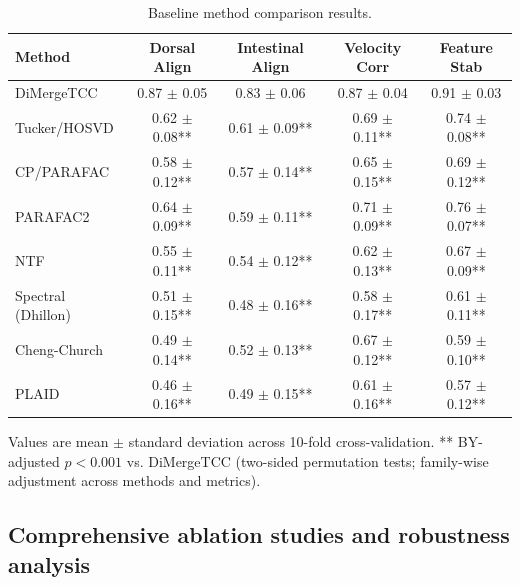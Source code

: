 \documentclass[unnumsec,webpdf,modern,large,namedate]{oup-authoring-template}%
\theoremstyle{thmstyleone}\newtheorem{theorem}{Theorem}
\theoremstyle{thmstyletwo}\newtheorem{example}{Example}
\theoremstyle{thmstylethree}\newtheorem{definition}{Definition}
\begin{document}
\begin{table}[t]
\centering
\caption{Baseline method comparison results.}
\label{tab:baseline_comparison}
\begin{tabular}{lcccc}
\toprule
\textbf{Method} & \textbf{Dorsal Align} & \textbf{Intestinal Align} & \textbf{Velocity Corr} & \textbf{Feature Stab} \\
\midrule
DiMergeTCC & 0.87 $\pm$ 0.05 & 0.83 $\pm$ 0.06 & 0.87 $\pm$ 0.04 & 0.91 $\pm$ 0.03 \\
Tucker/HOSVD & 0.62 $\pm$ 0.08** & 0.61 $\pm$ 0.09** & 0.69 $\pm$ 0.11** & 0.74 $\pm$ 0.08** \\
CP/PARAFAC & 0.58 $\pm$ 0.12** & 0.57 $\pm$ 0.14** & 0.65 $\pm$ 0.15** & 0.69 $\pm$ 0.12** \\
PARAFAC2 & 0.64 $\pm$ 0.09** & 0.59 $\pm$ 0.11** & 0.71 $\pm$ 0.09** & 0.76 $\pm$ 0.07** \\
NTF & 0.55 $\pm$ 0.11** & 0.54 $\pm$ 0.12** & 0.62 $\pm$ 0.13** & 0.67 $\pm$ 0.09** \\
Spectral (Dhillon) & 0.51 $\pm$ 0.15** & 0.48 $\pm$ 0.16** & 0.58 $\pm$ 0.17** & 0.61 $\pm$ 0.11** \\
Cheng-Church & 0.49 $\pm$ 0.14** & 0.52 $\pm$ 0.13** & 0.67 $\pm$ 0.12** & 0.59 $\pm$ 0.10** \\
PLAID & 0.46 $\pm$ 0.16** & 0.49 $\pm$ 0.15** & 0.61 $\pm$ 0.16** & 0.57 $\pm$ 0.12** \\
\bottomrule
\end{tabular}
\begin{tablenotes}
Values are mean $\pm$ standard deviation across 10-fold cross-validation. 
** BY-adjusted $p < 0.001$ vs. DiMergeTCC (two-sided permutation tests; family-wise adjustment across methods and metrics).
\end{tablenotes}
\end{table}

\subsection{Comprehensive ablation studies and robustness analysis}
\label{subsec:val_robust}
\end{document}
